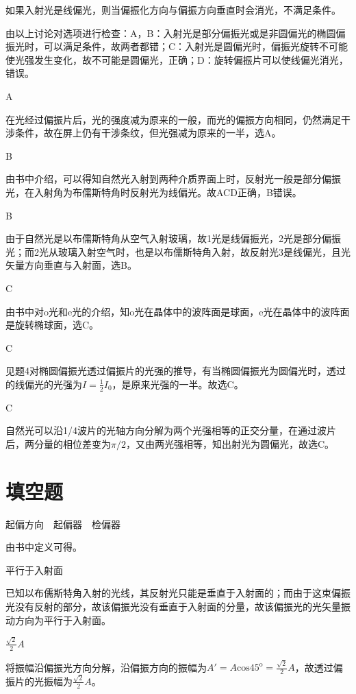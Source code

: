 如果入射光是线偏光，则当偏振化方向与偏振方向垂直时会消光，不满足条件。

由以上讨论对选项进行检查：A，B：入射光是部分偏振光或是非圆偏光的椭圆偏振光时，可以满足条件，故两者都错；C：入射光是圆偏光时，偏振光旋转不可能使光强发生变化，故不可能是圆偏光，正确；D：旋转偏振片可以使线偏光消光，错误。

\exercise A

\solve 在光经过偏振片后，光的强度减为原来的一般，而光的偏振方向相同，仍然满足干涉条件，故在屏上仍有干涉条纹，但光强减为原来的一半，选A。

\exercise B

\solve 由书中介绍，可以得知自然光入射到两种介质界面上时，反射光一般是部分偏振光，在入射角为布儒斯特角时反射光为线偏光。故ACD正确，B错误。

\exercise B

\solve 由于自然光是以布儒斯特角从空气入射玻璃，故1光是线偏振光，2光是部分偏振光；而2光从玻璃入射空气时，也是以布儒斯特角入射，故反射光3是线偏光，且光矢量方向垂直与入射面，选B。

\exercise C

\solve 由书中对o光和e光的介绍，知o光在晶体中的波阵面是球面，e光在晶体中的波阵面是旋转椭球面，选C。

\exercise C

\solve 见题4对椭圆偏振光透过偏振片的光强的推导，有当椭圆偏振光为圆偏光时，透过的线偏光的光强为$I=\frac{1}{2}I_0$，是原来光强的一半。故选C。

\exercise C

\solve 自然光可以沿1/4波片的光轴方向分解为两个光强相等的正交分量，在通过波片后，两分量的相位差变为$\pi/2$，又由两光强相等，知出射光为圆偏光，故选C。

\section{填空题}

\exercise 起偏方向$\quad$起偏器$\quad$检偏器

\solve 由书中定义可得。

\exercise 平行于入射面

\solve 已知以布儒斯特角入射的光线，其反射光只能是垂直于入射面的；而由于这束偏振光没有反射的部分，故该偏振光没有垂直于入射面的分量，故该偏振光的光矢量振动方向为平行于入射面。

\exercise $\frac{\sqrt{2}}{2}A$

\solve 将振幅沿偏振光方向分解，沿偏振方向的振幅为$A'=A\mathrm{cos}45^{\mathrm{o}}=\frac{\sqrt{2}}{2}A$，故透过偏振片的光振幅为$\frac{\sqrt{2}}{2}A$。

